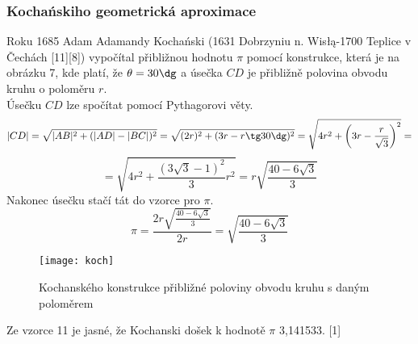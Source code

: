 \documentclass[rocnikovka]{gzwroc} %
\begin{document}
\subsubsection{Kochańskiho geometrická aproximace}
Roku 1685 Adam Adamandy Kochański (1631 Dobrzyniu n. Wisłą-1700 Teplice v Čechách [11][8]) vypočítal přibližnou hodnotu $\pi$ pomocí konstrukce, která je na obrázku 7, kde platí, že $\theta =30\dg$ a úsečka $CD$ je přibližně polovina obvodu kruhu o poloměru $r$.\\
Úsečku $CD$ lze spočítat pomocí Pythagorovi věty.
$$ |CD|=\sqrt{|AB|^2+(|AD|-|BC|)^2}=\sqrt{(2r)^2+(3r-r\tg 30\dg)^2} = \sqrt{4r^2+\left(3r-\frac{r}{\sqrt{3}}\right)^2}= $$
\begin{equation}
=\sqrt{4r^2+\frac{(3\sqrt{3}-1)^2}{3}r^2} = r\sqrt{\frac{40-6\sqrt{3}}{3}}
\end{equation}
Nakonec úsečku stačí tát do vzorce pro $\pi$.
\begin{equation}
\pi=\frac{2r\sqrt{\frac{40-6\sqrt{3}}{3}}}{2r}=\sqrt{\frac{40-6\sqrt{3}}{3}}
\end{equation}
\begin{figure}[!ht]
\texttt{[image: koch]}
\caption{Kochanského konstrukce přibližné poloviny obvodu kruhu s daným poloměrem}
\label{fig:kruh}
\end{figure}
Ze vzorce 11 je jasné, že Kochanski došek k hodnotě $\pi$ 3,141533. [1]
\end{document}
